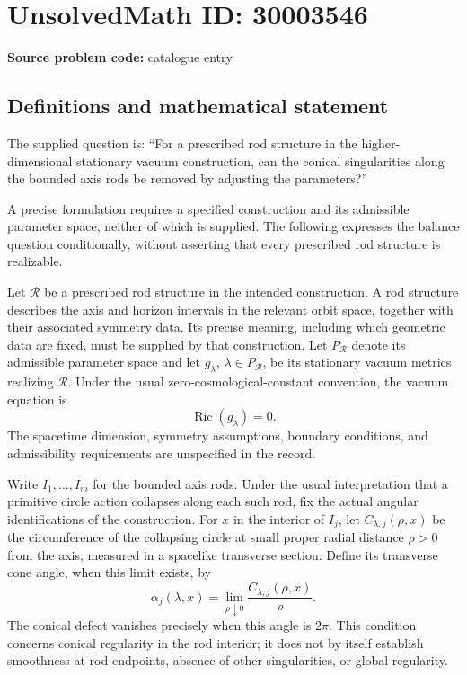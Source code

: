 \documentclass[11pt]{article}
\begin{document}
\section*{UnsolvedMath ID: 30003546}
\textbf{Source problem code:} catalogue entry
\subsection{Definitions and mathematical statement}
The supplied question is: ``For a prescribed rod structure in the higher-dimensional stationary vacuum construction, can the conical singularities along the bounded axis rods be removed by adjusting the parameters?''

A precise formulation requires a specified construction and its admissible parameter space, neither of which is supplied. The following expresses the balance question conditionally, without asserting that every prescribed rod structure is realizable.

Let \(\mathcal R\) be a prescribed rod structure in the intended construction. A rod structure describes the axis and horizon intervals in the relevant orbit space, together with their associated symmetry data. Its precise meaning, including which geometric data are fixed, must be supplied by that construction. Let \(P_{\mathcal R}\) denote its admissible parameter space and let \(g_\lambda\), \(\lambda\in P_{\mathcal R}\), be its stationary vacuum metrics realizing \(\mathcal R\). Under the usual zero-cosmological-constant convention, the vacuum equation is
\[
\operatorname{Ric}(g_\lambda)=0.
\]
The spacetime dimension, symmetry assumptions, boundary conditions, and admissibility requirements are unspecified in the record.

Write \(I_1,\ldots,I_m\) for the bounded axis rods. Under the usual interpretation that a primitive circle action collapses along each such rod, fix the actual angular identifications of the construction. For \(x\) in the interior of \(I_j\), let \(C_{\lambda,j}(\rho,x)\) be the circumference of the collapsing circle at small proper radial distance \(\rho>0\) from the axis, measured in a spacelike transverse section. Define its transverse cone angle, when this limit exists, by
\[
\alpha_j(\lambda,x)
 =\lim_{\rho\downarrow0}
 \frac{C_{\lambda,j}(\rho,x)}{\rho}.
\]
The conical defect vanishes precisely when this angle is \(2\pi\). This condition concerns conical regularity in the rod interior; it does not by itself establish smoothness at rod endpoints, absence of other singularities, or global regularity.
\end{document}
